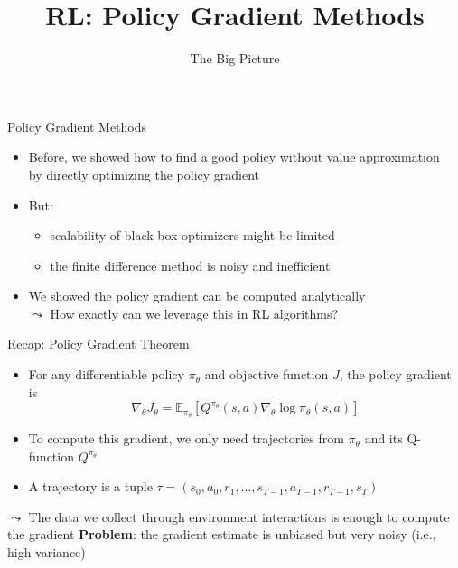 \documentclass[aspectratio=169]{../latex_main/tntbeamer}  %
\title[RL: Big Picture]{RL: Policy Gradient Methods}
\subtitle{The Big Picture}
\begin{document}
	
	\maketitle

\begin{frame}[c]{Policy Gradient Methods}

\begin{itemize}
	\item Before, we showed how to find a good policy without value approximation\\ by directly optimizing the policy gradient
	\item But:
        \begin{itemize}
            \item scalability of black-box optimizers might be limited
            \item the finite difference method is noisy and inefficient 
        \end{itemize}
	\item We showed the policy gradient can be computed analytically\\
        $\leadsto$ How exactly can we leverage this in RL algorithms?
\end{itemize}

\end{frame}
\begin{frame}[c]{Recap: Policy Gradient Theorem}

	\begin{itemize}
		\item For any differentiable policy $\pi_\theta$ and objective function $J$, the policy gradient is $$\nabla_\theta J_\theta= \mathbb{E}_{\pi_\theta} [Q^{\pi_\theta}(s,a) \nabla_\theta \log \pi_\theta(s,a) ] $$
		\item To compute this gradient, we only need trajectories from $\pi_\theta$ and its Q-function $Q^{\pi_\theta}$
        \item A trajectory is a tuple $\tau = (s_0, a_0, r_1, \ldots, s_{T-1}, a_{T-1}, r_{T-1}, s_T)$
	\end{itemize}		
\bigskip
	$\leadsto$ The data we collect through environment interactions is enough to compute the gradient
    \newline
    \textbf{Problem}: the gradient estimate is unbiased but very noisy (i.e., high variance)
\end{frame}
\end{document}
